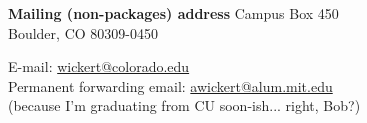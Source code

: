 \documentclass{book}
\begin{document}
\begin{centering}
\textbf{Mailing (non-packages) address}
Campus Box 450\\
Boulder, CO 80309-0450\\
\end{centering}
\vspace{12pt}

\begin{centering}
\noindent E-mail: \url{wickert@colorado.edu}\\
Permanent forwarding email: \url{awickert@alum.mit.edu}\\
(because I'm graduating from CU soon-ish... right, Bob?)\\
\end{centering}
\end{document}
